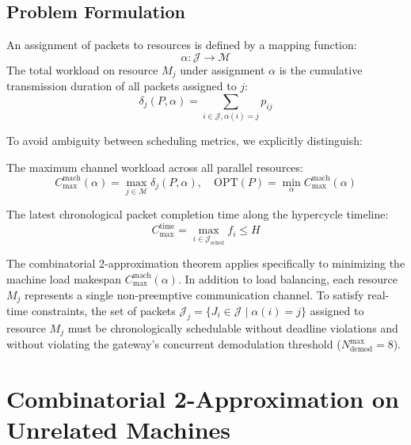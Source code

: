 \documentclass{article}
\begin{document}
\subsection{Problem Formulation}
An assignment of packets to resources is defined by a mapping function:
\begin{equation}
\alpha: \mathcal{J} \to \mathcal{M}
\end{equation}
The total workload on resource $M_j$ under assignment $\alpha$ is the cumulative transmission duration of all packets assigned to $j$:
\begin{equation}
\delta_j(P, \alpha) = \sum_{i \in \mathcal{J}, \alpha(i) = j} p_{ij}
\end{equation}

To avoid ambiguity between scheduling metrics, we explicitly distinguish:
\begin{definition}
The maximum channel workload across all parallel resources:
\begin{equation}
C_{\max}^{\text{mach}}(\alpha) = \max_{j \in \mathcal{M}} \delta_j(P, \alpha), \quad \text{OPT}(P) = \min_{\alpha} C_{\max}^{\text{mach}}(\alpha)
\end{equation}
\end{definition}

\begin{definition}
The latest chronological packet completion time along the hypercycle timeline:
\begin{equation}
C_{\max}^{\text{time}} = \max_{i \in \mathcal{J}_{\text{sched}}} f_i \le H
\end{equation}
\end{definition}

The combinatorial 2-approximation theorem applies specifically to minimizing the machine load makespan $C_{\max}^{\text{mach}}(\alpha)$. In addition to load balancing, each resource $M_j$ represents a single non-preemptive communication channel. To satisfy real-time constraints, the set of packets $\mathcal{J}_j = \{J_i \in \mathcal{J} \mid \alpha(i) = j\}$ assigned to resource $M_j$ must be chronologically schedulable without deadline violations and without violating the gateway's concurrent demodulation threshold ($N_{\text{demod}}^{\max} = 8$).

\section{Combinatorial 2-Approximation on Unrelated Machines}
\label{sec:approx_theory}
\end{document}
